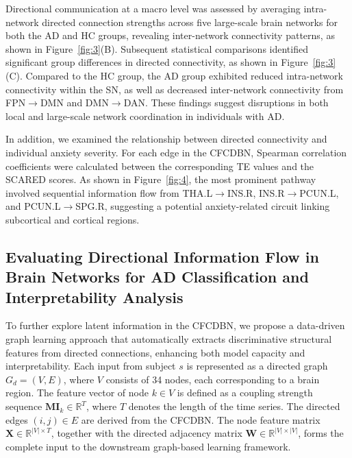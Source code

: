 \documentclass[lettersize,journal]{IEEEtran}
\begin{document}
Directional communication at a macro level was assessed by averaging intra-network directed connection strengths across five large-scale brain networks for both the AD and HC groups, revealing inter-network connectivity patterns, as shown in Figure~\ref{fig:3}(B).  
Subsequent statistical comparisons identified significant group differences in directed connectivity, as shown in Figure~\ref{fig:3}(C).  
Compared to the HC group, the AD group exhibited reduced intra-network connectivity within the SN, as well as decreased inter-network connectivity from FPN$\rightarrow$DMN and DMN$\rightarrow$DAN.  
These findings suggest disruptions in both local and large-scale network coordination in individuals with AD.

In addition, we examined the relationship between directed connectivity and individual anxiety severity. For each edge in the CFCDBN, Spearman correlation coefficients were calculated between the corresponding TE values and the SCARED scores. As shown in Figure~\ref{fig:4}, the most prominent pathway involved sequential information flow from THA.L$\rightarrow$INS.R, INS.R$\rightarrow$PCUN.L, and PCUN.L$\rightarrow$SPG.R, suggesting a potential anxiety-related circuit linking subcortical and cortical regions.

\subsection{Evaluating Directional Information Flow in Brain Networks for AD Classification and Interpretability Analysis}

To further explore latent information in the CFCDBN, we propose a data-driven graph learning approach that automatically extracts discriminative structural features from directed connections, enhancing both model capacity and interpretability.
Each input from subject \( s \) is represented as a directed graph \( G_d = (V, E) \), where \( V \) consists of 34 nodes, each corresponding to a brain region. The feature vector of node \( k \in V \) is defined as a coupling strength sequence \( \mathbf{MI}_k \in \mathbb{R}^T \), where \( T \) denotes the length of the time series. The directed edges \( (i, j) \in E \) are derived from the CFCDBN. The node feature matrix \( \mathbf{X} \in \mathbb{R}^{|V| \times T} \), together with the directed adjacency matrix \( \mathbf{W} \in \mathbb{R}^{|V| \times |V|} \), forms the complete input to the downstream graph-based learning framework.
\end{document}
